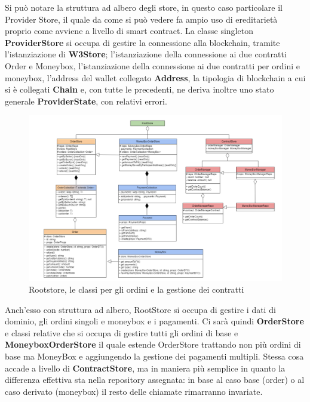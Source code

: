 Si può notare la struttura ad albero degli store, in questo caso particolare il Provider Store, 
il quale da come si può vedere fa ampio uso di ereditarietà proprio come avviene a livello di smart contract.
La classe singleton \textbf{ProviderStore} si occupa di gestire la connessione alla blockchain, tramite l'istanziazione di \textbf{W3Store}; 
l'istanziazione della connessione ai due contratti Order e Moneybox, 
l’istanziazione della  connessione ai due contratti per ordini e moneybox, l'address del wallet collegato \textbf{Address}, la tipologia di blockchain a cui si è collegati \textbf{Chain} e, con tutte le precedenti, 
ne deriva inoltre uno stato generale \textbf{ProviderState}, con relativi errori.
\clearpage

\begin{figure}[H]
    \centering
    \includegraphics[scale = 0.5]{immagini/rootstore.png}
    \caption{Rootstore, le classi per gli ordini e la gestione dei contratti}
\end{figure}

Anch'esso con struttura ad albero, RootStore si occupa di gestire i dati di dominio, gli ordini singoli e moneybox e i pagamenti.
Ci sarà quindi \textbf{OrderStore} e classi relative che si occupa di gestire tutti gli ordini di base 
e \textbf{MoneyboxOrderStore} il quale estende OrderStore trattando non più ordini di base ma MoneyBox e aggiungendo la gestione dei pagamenti multipli.
Stessa cosa accade a livello di \textbf{ContractStore}, ma in maniera più semplice in quanto la differenza effettiva sta nella repository assegnata: in base al caso base (order) o al caso derivato (moneybox) il resto delle chiamate rimarranno invariate.

